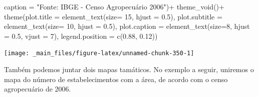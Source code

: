 \documentclass[
  brazilian,
]{book}
\newenvironment{Shaded}{\begin{snugshade}}{\end{snugshade}}
\newcommand{\AttributeTok}[1]{\textcolor[rgb]{0.77,0.63,0.00}{#1}}
\newcommand{\DecValTok}[1]{\textcolor[rgb]{0.00,0.00,0.81}{#1}}
\newcommand{\FloatTok}[1]{\textcolor[rgb]{0.00,0.00,0.81}{#1}}
\newcommand{\FunctionTok}[1]{\textcolor[rgb]{0.00,0.00,0.00}{#1}}
\newcommand{\NormalTok}[1]{#1}
\newcommand{\SpecialCharTok}[1]{\textcolor[rgb]{0.00,0.00,0.00}{#1}}
\newcommand{\StringTok}[1]{\textcolor[rgb]{0.31,0.60,0.02}{#1}}
\begin{document}
\begin{Shaded}
\begin{Highlighting}[]
       \AttributeTok{caption =} \StringTok{"Fonte: IBGE {-} Censo Agropecuário 2006"}\NormalTok{)}\SpecialCharTok{+}
  \FunctionTok{theme\_void}\NormalTok{()}\SpecialCharTok{+}
  \FunctionTok{theme}\NormalTok{(}\AttributeTok{plot.title =} \FunctionTok{element\_text}\NormalTok{(}\AttributeTok{size=} \DecValTok{15}\NormalTok{, }\AttributeTok{hjust =} \FloatTok{0.5}\NormalTok{),}
        \AttributeTok{plot.subtitle =} \FunctionTok{element\_text}\NormalTok{(}\AttributeTok{size=} \DecValTok{10}\NormalTok{, }\AttributeTok{hjust =} \FloatTok{0.5}\NormalTok{),}
        \AttributeTok{plot.caption =} \FunctionTok{element\_text}\NormalTok{(}\AttributeTok{size=}\DecValTok{8}\NormalTok{, }\AttributeTok{hjust =} \FloatTok{0.5}\NormalTok{, }\AttributeTok{vjust =} \DecValTok{7}\NormalTok{),}
        \AttributeTok{legend.position =} \FunctionTok{c}\NormalTok{(}\FloatTok{0.88}\NormalTok{, }\FloatTok{0.12}\NormalTok{))}
\end{Highlighting}
\end{Shaded}

\begin{center}\texttt{[image: \_main\_files/figure-latex/unnamed-chunk-350-1]} \end{center}

Também podemos juntar dois mapas tamáticos. No exemplo a seguir, uniremos o mapa do número de estabelecimentos com a área, de acordo com o censo agropecuário de 2006.
\end{document}
